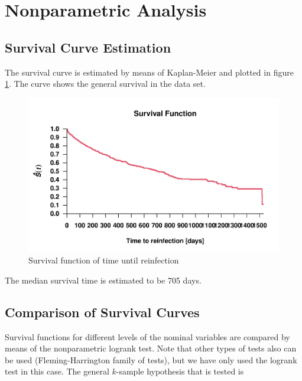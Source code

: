 \documentclass[
]{article}
\begin{document}
\hypertarget{nonparametric-analysis}{%
\section{Nonparametric Analysis}\label{nonparametric-analysis}}

\hypertarget{survival-curve-estimation}{%
\subsection{Survival Curve Estimation}\label{survival-curve-estimation}}

The survival curve is estimated by means of Kaplan-Meier and plotted in figure \ref{fig:survivalf}. The curve shows the general survival in the data set.

\begin{figure}
\centering
\includegraphics{practical_files/figure-latex/survivalf-1.pdf}
\caption{\label{fig:survivalf}Survival function of time until reinfection}
\end{figure}

The median survival time is estimated to be 705 days.

\hypertarget{comparison-of-survival-curves}{%
\subsection{Comparison of Survival Curves}\label{comparison-of-survival-curves}}

Survival functions for different levels of the nominal variables are compared by means of the nonparametric logrank test. Note that other types of tests also can be used (Fleming-Harrington family of tests), but we have only used the logrank test in this case. The general \(k\)-sample hypothesis that is tested is
\end{document}

